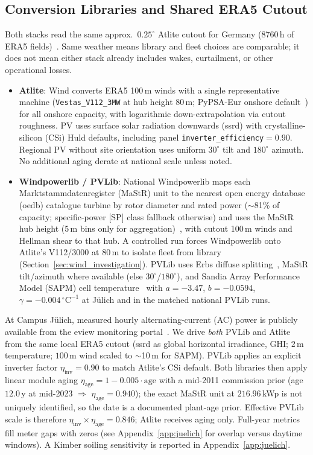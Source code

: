 \documentclass[preprint,12pt,number]{elsarticle}
\begin{document}
\subsection{Conversion Libraries and Shared ERA5 Cutout}
Both stacks read the same approx.\ $0.25^\circ$ Atlite cutout for Germany (8760\,h of ERA5 fields)~\citep{Hofmann2021,Hersbach2020,ERA5CDS}.
Same weather means library and fleet choices are comparable; it does not mean either stack already includes wakes, curtailment, or other operational losses.
\begin{itemize}
    \item \textbf{Atlite}: Wind converts ERA5 100\,m winds with a single representative machine (\texttt{Vestas\_V112\_3MW} at hub height 80\,m; PyPSA-Eur onshore default~\citep{PyPSAEur}) for all onshore capacity, with logarithmic down-extrapolation via cutout roughness.
    PV uses surface solar radiation downwards (ssrd) with crystalline-silicon (CSi) Huld defaults, including panel \texttt{inverter\_efficiency}$=0.90$.
    Regional PV without site orientation uses uniform $30^\circ$ tilt and $180^\circ$ azimuth.
    No additional aging derate at national scale unless noted.
    \item \textbf{Windpowerlib / PVLib}: National Windpowerlib maps each Marktstammdatenregister (MaStR) unit to the nearest open energy database (oedb) catalogue turbine by rotor diameter and rated power ($\sim$81\% of capacity; specific-power [SP] class fallback otherwise) and uses the MaStR hub height (5\,m bins only for aggregation)~\citep{Muljadi2010MachineEquivalent}, with cutout 100\,m winds and Hellman shear to that hub.
    A controlled run forces Windpowerlib onto Atlite's V112/3000 at 80\,m to isolate fleet from library (Section~\ref{sec:wind_investigation}).
    PVLib uses Erbs diffuse splitting~\citep{Erbs1982}, MaStR tilt/azimuth where available (else $30^\circ$/$180^\circ$), and Sandia Array Performance Model (SAPM) cell temperature~\citep{king2004photovoltaic} with $a=-3.47$, $b=-0.0594$, $\gamma=-0.004\,^\circ\mathrm{C}^{-1}$ at Jülich and in the matched national PVLib runs.
\end{itemize}

At Campus Jülich, measured hourly alternating-current (AC) power is publicly available from the eview monitoring portal~\citep{eviewJuelich}.
We drive \emph{both} PVLib and Atlite from the same local ERA5 cutout (ssrd as global horizontal irradiance, GHI; $2$\,m temperature; $100$\,m wind scaled to $\sim$10\,m for SAPM).
PVLib applies an explicit inverter factor $\eta_{\mathrm{inv}}=0.90$ to match Atlite's CSi default.
Both libraries then apply linear module aging $\eta_{\mathrm{age}}=1-0.005\cdot\mathrm{age}$ with a mid-2011 commission prior (age $12.0$\,y at mid-2023 $\Rightarrow$ $\eta_{\mathrm{age}}=0.940$); the exact MaStR unit at $216.96$\,kWp is not uniquely identified, so the date is a documented plant-age prior.
Effective PVLib scale is therefore $\eta_{\mathrm{inv}}\times\eta_{\mathrm{age}}=0.846$; Atlite receives aging only.
Full-year metrics fill meter gaps with zeros (see Appendix~\ref{app:juelich} for overlap versus daytime windows).
A Kimber soiling sensitivity is reported in Appendix~\ref{app:juelich}.
\end{document}
